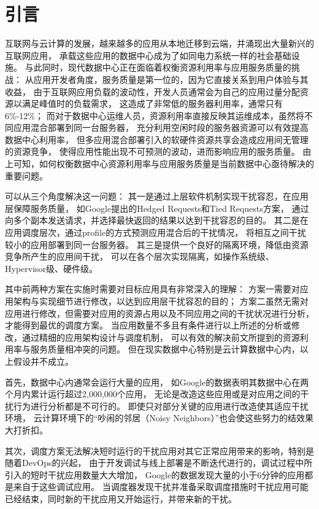 

\chapter{引言}
\label{chap:intro}

互联网与云计算的发展，越来越多的应用从本地迁移到云端，并涌现出大量新兴的互联网应用，
承载这些应用的数据中心成为了如同电力系统一样的社会基础设施。
与此同时，现代数据中心正在面临着权衡资源利用率与应用服务质量的挑战：
从应用开发者角度，服务质量是第一位的，因为它直接关系到用户体验与其收益，
由于互联网应用负载的波动性，开发人员通常会为自己的应用过量分配资源以满足峰值时的负载需求，
这造成了非常低的服务器利用率，通常只有6\%-12\%；
而对于数据中心运维人员，资源利用率直接反映其运维成本，虽然将不同应用混合部署到同一台服务器，
充分利用空闲时段的服务器资源可以有效提高数据中心利用率，
但多应用混合部署引入的软硬件资源共享会造成应用间无管理的资源竞争，
使得应用性能出现不可预测的波动，进而影响应用的服务质量。
由上可知，如何权衡数据中心资源利用率与应用服务质量是当前数据中心亟待解决的重要问题。

可以从三个角度解决这一问题：
其一是通过上层软件机制实现干扰容忍，在应用层保障服务质量，
如Google提出的Hedged Requests和Tied Requests方案\cite{dean_tail_2013}，
通过向多个副本发送请求，并选择最快返回的结果以达到干扰容忍的目的。%
其二是在应用调度层次，通过profile的方式预测应用混合后的干扰情况，
将相互之间干扰较小的应用部署到同一台服务器。
其三是提供一个良好的隔离环境，降低由资源竞争所产生的应用间干扰，
可以在各个层次实现隔离，如操作系统级\cite{cgroup}、Hypervisor级\cite{}、硬件级\cite{}。

其中前两种方案在实施时需要对目标应用具有非常深入的理解：
方案一需要对应用架构与实现细节进行修改，以达到应用层干扰容忍的目的；
方案二虽然无需对应用进行修改，但需要对应用的资源占用以及不同应用之间的干扰状况进行分析，
才能得到最优的调度方案。
当应用数量不多且有条件进行以上所述的分析或修改，通过精细的应用架构设计与调度机制，
可以有效的解决前文所提到的资源利用率与服务质量相冲突的问题。
但在现实数据中心特别是云计算数据中心内，以上假设并不成立。

首先，数据中心内通常会运行大量的应用，
如Google的数据\cite{}表明其数据中心在两个月内累计运行超过2,000,000个应用，
无论是改造这些应用或是对应用之间的干扰行为进行分析都是不可行的。
即使只对部分关键的应用进行改造使其适应干扰环境，
云计算环境下的``吵闹的邻居（Noisy Neighbors）''也会使这些努力的结效果大打折扣。

其次，调度方案无法解决短时运行的干扰应用对其它正常应用带来的影响，特别是随着DevOps的兴起，
由于开发调试与线上部署是不断迭代进行的，调试过程中所引入的短时干扰应用数量大大增加，
Google的数据\cite{}发现大量的小于6分钟的应用都是来自于这些调试应用。
当调度器发现干扰并准备采取调度措施时干扰应用可能已经结束，同时新的干扰应用又开始运行，并带来新的干扰。

